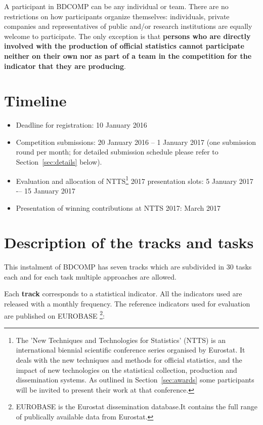 \documentclass[12pt]{article}
\begin{document}
A participant in BDCOMP can be any individual or team. There are no restrictions on how participants organize themselves: individuals, private companies and representatives of public and/or research institutions are equally welcome to participate. The only exception is that \textbf{persons who are directly involved with the production of official statistics cannot participate neither on their own nor as part of a team in the competition for the indicator that they are producing}. 

\newpage
\section{Timeline}
\begin{itemize}
\item{Deadline for registration: 10 January 2016}
\item{Competition submissions: 20 January 2016 -- 1 January 2017 (one submission round per month; for detailed submission schedule please refer to Section~\ref{sec:details} below).}
\item{Evaluation and allocation of NTTS\footnote{The 'New Techniques and Technologies for Statistics' (NTTS) is an international biennial scientific conference series organised by Eurostat. It deals with the new techniques and methods for official statistics, and the impact of new technologies on the statistical collection, production and dissemination systems. As outlined in Section~\ref{sec:awards} some participants will be invited to present their work at that conference.} 2017 presentation slots:  5 January 2017 -– 15 January 2017}
\item{Presentation of winning contributions at NTTS 2017: March 2017}
\end{itemize}

\newpage
\section{Description of the tracks and tasks}
\label{sec:tasks}
This instalment of BDCOMP has seven tracks which are subdivided in 30 tasks each and for each task multiple approaches are allowed. 

Each \textbf{track} corresponds to a statistical indicator. All the indicators used are released with a monthly frequency. The reference indicators used for evaluation are published on EUROBASE \footnote{EUROBASE is the Eurostat dissemination database.It contains the full range of publically available data from Eurostat. }:
\end{document}
